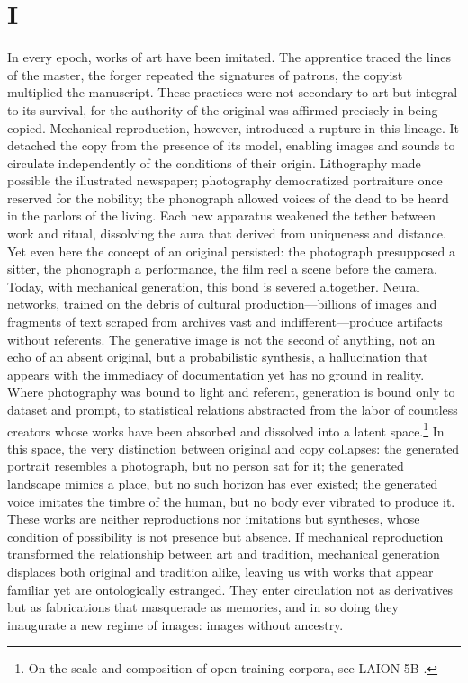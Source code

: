 \documentclass[12pt]{article}
\begin{document}
\section*{I}

In every epoch, works of art have been imitated. The apprentice traced the lines of the master, the forger repeated the signatures of patrons, the copyist multiplied the manuscript. These practices were not secondary to art but integral to its survival, for the authority of the original was affirmed precisely in being copied. Mechanical reproduction, however, introduced a rupture in this lineage. It detached the copy from the presence of its model, enabling images and sounds to circulate independently of the conditions of their origin. Lithography made possible the illustrated newspaper; photography democratized portraiture once reserved for the nobility; the phonograph allowed voices of the dead to be heard in the parlors of the living. Each new apparatus weakened the tether between work and ritual, dissolving the aura that derived from uniqueness and distance. Yet even here the concept of an original persisted: the photograph presupposed a sitter, the phonograph a performance, the film reel a scene before the camera. Today, with mechanical generation, this bond is severed altogether. Neural networks, trained on the debris of cultural production---billions of images and fragments of text scraped from archives vast and indifferent---produce artifacts without referents. The generative image is not the second of anything, not an echo of an absent original, but a probabilistic synthesis, a hallucination that appears with the immediacy of documentation yet has no ground in reality. Where photography was bound to light and referent, generation is bound only to dataset and prompt, to statistical relations abstracted from the labor of countless creators whose works have been absorbed and dissolved into a latent space.\footnote{On the scale and composition of open training corpora, see LAION-5B \autocite{Schuhmann2022}.} In this space, the very distinction between original and copy collapses: the generated portrait resembles a photograph, but no person sat for it; the generated landscape mimics a place, but no such horizon has ever existed; the generated voice imitates the timbre of the human, but no body ever vibrated to produce it. These works are neither reproductions nor imitations but syntheses, whose condition of possibility is not presence but absence. If mechanical reproduction transformed the relationship between art and tradition, mechanical generation displaces both original and tradition alike, leaving us with works that appear familiar yet are ontologically estranged. They enter circulation not as derivatives but as fabrications that masquerade as memories, and in so doing they inaugurate a new regime of images: images without ancestry.
\end{document}
